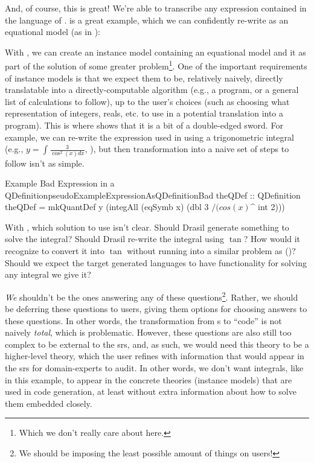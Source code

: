 \pseudoExampleExpression{}

And, of course, this is great! We're able to transcribe any expression contained
in the language of \Expr{}.  is a great example,
which we can confidently re-write as an equational model (as in
):


With , we can create an instance
model containing an equational model and it as part of the solution of some
greater problem\footnote{Which we don't really care about here.}. One of the
important requirements of instance models is that we expect them to be,
relatively naively, directly translatable into a directly-computable algorithm
(e.g., a program, or a general list of calculations to follow), up to the user's
choices (such as choosing what representation of integers, reals, etc. to use in
a potential translation into a program). This is where \Expr{} shows that it is
a bit of a double-edged sword. For example, we can re-write the expression used
in  using a trigonometric
integral (e.g., $y = \int {}$,
), but then transformation
into a naive set of steps to follow isn't as simple.

\begin{pseudohaskell}{Example Bad Expression in a QDefinition}{pseudoExampleExpressionAsQDefinitionBad}
theQDef :: QDefinition
theQDef = mkQuantDef y (integAll (eqSymb x) (dbl 3 $/ (cos (x) $^ int 2)))
\end{pseudohaskell}

With , which solution to use
isn't clear. Should Drasil generate something to solve the integral? Should
Drasil re-write the integral using $\tan$? How would it recognize to convert it
into $\tan$ without running into a similar problem as \relToQD{}
()? Should we expect the target generated languages to
have functionality for solving any integral we give it?

\textit{We} shouldn't be the ones answering any of these questions\footnote{We
should be imposing the least possible amount of things on users!}. Rather, we
should be deferring these questions to users, giving them options for choosing
answers to these questions. In other words, the transformation from \Expr{}s to
``code'' is not naively \textit{total}, which is problematic. However, these
questions are also still too complex to be external to the \acs{srs}, and, as
such, we would need this theory to be a higher-level theory, which the user
refines with information that would appear in the \acs{srs} for domain-experts
to audit. In other words, we don't want integrals, like in this example, to
appear in the concrete theories (instance models) that are used in code
generation, at least without extra information about how to solve them embedded
closely.

